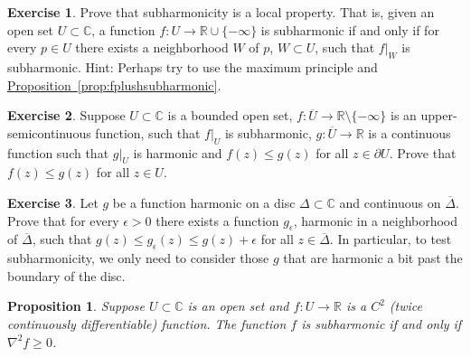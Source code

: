 \documentclass[12pt,openany]{book}
\newcommand{\C}{{\mathbb{C}}}
\newcommand{\R}{{\mathbb{R}}}
\theoremstyle{plain}
\newtheorem{prop}[thm]{Proposition}
\theoremstyle{remark}
\theoremstyle{definition}
\newenvironment{exbox}{%
    \def\FrameCommand{\vrule width 1pt \relax\hspace{10pt}}%
    \MakeFramed{\advance\hsize-\width\FrameRestore}%
}{%
    \endMakeFramed
}
\theoremstyle{exercise}
\newtheorem{exercise}{Exercise}[section]
\theoremstyle{example}
\newcommand{\propref}[1]{\hyperref[#1]{Proposition~\ref*{#1}}}
\begin{document}
\begin{exbox}
\begin{exercise}
Prove that subharmonicity is a local property.  That is, given an open set
$U \subset \C$, a function $f \colon U \to \R \cup \{ -\infty \}$ is subharmonic if
and only if for every $p \in U$ there exists a neighborhood $W$ of $p$,
$W \subset U$, such that $f|_{W}$ is subharmonic.  Hint: Perhaps try to use
the maximum principle and \propref{prop:fplushsubharmonic}.
\end{exercise}

\begin{exercise}
Suppose $U \subset \C$ is a bounded open set, $f \colon \overline{U} \to \R
\setminus \{-\infty\}$ is an upper-semicontinuous function, such that $f|_U$
is subharmonic, $g \colon \overline{U} \to \R$ is a continuous function
such that $g|_U$ is harmonic and
$f(z) \leq g(z)$ for all $z \in \partial U$.  Prove that
$f(z) \leq g(z)$ for all $z \in U$.
\end{exercise}

\begin{exercise} \label{exercise:onlyniceuneededforsubharmonic}
Let $g$ be a function
harmonic on a disc $\Delta \subset \C$ and continuous on
$\overline{\Delta}$.  Prove that for every $\epsilon > 0$ there exists
a function $g_\epsilon$, harmonic in a neighborhood of $\overline{\Delta}$,
such that $g(z) \leq g_\epsilon(z) \leq g(z)+\epsilon$ for all $z \in
\overline{\Delta}$.
In particular, to test subharmonicity, we only need to consider those
$g$ that are harmonic a bit past the boundary of the disc.
\end{exercise}
\end{exbox}

\begin{prop}
Suppose $U \subset \C$ is an open set and $f \colon U \to \R$ is a $C^2$
(twice continuously differentiable) function.
The function $f$ is subharmonic if and only if
$\nabla^2 f \geq 0$.
\end{prop}
\end{document}
